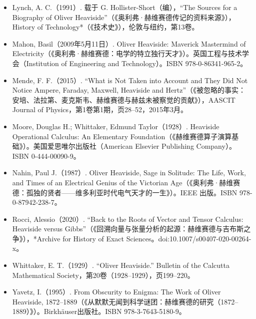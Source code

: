 \begin{itemize}
\item Lynch, A. C.（1991）. 载于 G. Hollister-Short（编），“The Sources for a Biography of Oliver Heaviside”（《奥利弗·赫维赛德传记的资料来源》），History of Technology*（《技术史》），伦敦与纽约，第13卷。
\item Mahon, Basil（2009年5月11日）. Oliver Heaviside: Maverick Mastermind of Electricity（《奥利弗·赫维赛德：电学的特立独行天才》）。英国工程与技术学会（Institution of Engineering and Technology）。ISBN 978-0-86341-965-2。
\item Mende, F. F.（2015）. “What is Not Taken into Account and They Did Not Notice Ampere, Faraday, Maxwell, Heaviside and Hertz”（《被忽略的事实：安培、法拉第、麦克斯韦、赫维赛德与赫兹未被察觉的贡献》），AASCIT Journal of Physics，第1卷第1期，页28–52，2015年3月。
\item Moore, Douglas H.; Whittaker, Edmund Taylor（1928）. Heaviside Operational Calculus: An Elementary Foundation（《赫维赛德算子演算基础》）。美国爱思唯尔出版社（American Elsevier Publishing Company）。ISBN 0-444-00090-9。
\item Nahin, Paul J.（1987）. Oliver Heaviside, Sage in Solitude: The Life, Work, and Times of an Electrical Genius of the Victorian Age（《奥利弗·赫维赛德：孤独的贤者——维多利亚时代电气天才的一生》）。IEEE 出版。ISBN 978-0-87942-238-7。
\item Rocci, Alessio（2020）. “Back to the Roots of Vector and Tensor Calculus: Heaviside versus Gibbs”（《回溯向量与张量分析的起源：赫维赛德与吉布斯之争》），*Archive for History of Exact Sciences。doi:10.1007/s00407-020-00264-x。
\item Whittaker, E. T.（1929）. “Oliver Heaviside.” Bulletin of the Calcutta Mathematical Society，第20卷（1928–1929），页199–220。
\item Yavetz, I.（1995）. From Obscurity to Enigma: The Work of Oliver Heaviside, 1872–1889（《从默默无闻到科学谜团：赫维赛德的研究（1872–1889）》）。Birkhäuser出版社。ISBN 978-3-7643-5180-9。
\end{itemize}
